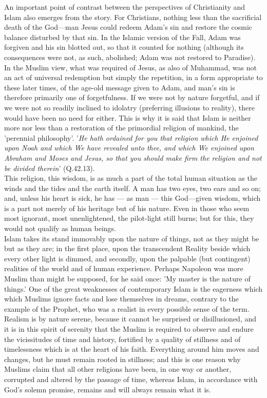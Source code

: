 \documentclass[11pt, b5paper, twoside]{book}
\begin{document}
An important point of contrast between the perspectives of Christianity and Islam also emerges from 
the story. For Christians, nothing less than the sacrificial death of the God---man Jesus could redeem 
Adam's sin and restore the cosmic balance disturbed by that sin. In the Islamic version of the Fall, 
Adam was forgiven and his sin blotted out, so that it counted for nothing (although its consequences 
were not, as such, abolished; Adam was not restored to Paradise). In the Muslim view, what was 
required of Jesus, as also of Muhammad, was not an act of universal redemption but simply the 
repetition, in a form appropriate to these later times, of the age-old message given to Adam, and 
man's sin is therefore primarily one of forgetfulness. If we were not by nature forgetful, and if we 
were not so readily inclined to idolatry (preferring illusions to reality), there would have been no 
need for either. This is why it is said that Islam is neither more nor less than a restoration of the 
primordial religion of mankind, the 'perennial philosophy'. '\emph{He hath ordained for you that religion 
which He enjoined upon Noah and which We have revealed unto thee, and which We enjoined upon Abraham and Moses and Jesus, so that you should make firm the religion and not be divided therein}' (Q.42.13).\\

This religion, this wisdom, is as much a part of the total human situation as the winds and the tides 
and the earth itself. A man has two eyes, two ears and so on; and, unless his heart is sick, he has --- 
as man --- this God---given wisdom, which is a part not merely of his heritage but of his nature. Even in 
those who seem most ignorant, most unenlightened, the pilot-light still burns; but for this, they 
would not qualify as human beings. \\

Islam takes its stand immovably upon the nature of things, not as they might be but as they are; in 
the first place, upon the transcendent Reality beside which every other light is dimmed, and 
secondly, upon the palpable (but contingent) realities of the world and of human experience. Perhaps 
Napoleon was more Muslim than might be supposed, for he said once: 'My master is the nature of things.' One of the great weaknesses of contemporary Islam is the eagerness which which Muslims ignore facts and lose themselves in dreams, contrary to the example of the Prophet, who was a realist in every possible sense of the term. Realism is by nature serene, because it cannot be surprised or disillusioned, and it is in this spirit of serenity that the Muslim is required to observe and endure the vicissitudes of time and history, fortified by a quality of stillness and of timelessness which is at the heart of his faith. Everything around him moves and changes, but he must remain rooted in stillness; and this is one reason why Muslims claim that all other religions have been, in one way or another, corrupted and altered by the passage of time, whereas Islam, in accordance with God's solemn promise, remains and will always remain what it is. \\
\end{document}
